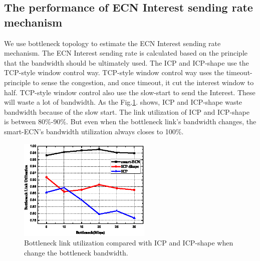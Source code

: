 \subsection{The performance of ECN Interest sending rate mechanism}

We use bottleneck topology to estimate the ECN Interest sending rate mechanism. The ECN Interest sending rate is calculated based on the principle that the bandwidth should be ultimately used. The ICP and ICP-shape use the TCP-style window control way. TCP-style window control way uses the timeout-principle to sense the congestion, and once timeout, it cut the interest window to half. TCP-style window control also use the slow-start to send the Interest. These will waste a lot of bandwidth. As the Fig.\ref{fig-linkuti}. shows, ICP and ICP-shape waste bandwidth because of the slow start. The link utilization of ICP and ICP-shape is between 80\%-90\%. But even when the bottleneck link's bandwidth changes, the smart-ECN's bandwidth utilization always closes to 100\%.
\begin{figure}[t]
\centering
\includegraphics[width=2.5in]{utilization-pic-cut.eps}
\centering
\caption{Bottleneck link utilization compared with ICP and ICP-shape when change the bottleneck bandwidth.}
\label{fig-linkuti}
\end{figure}

